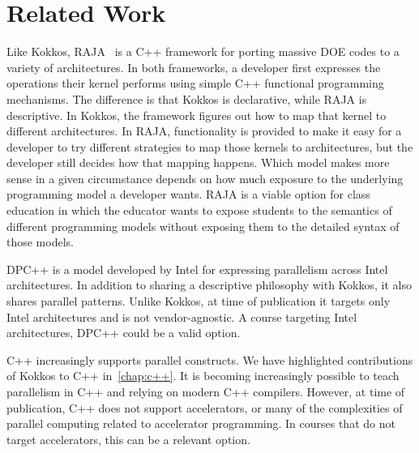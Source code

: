 \section{Related Work}\label{chap:related}
Like Kokkos, RAJA~\cite{RAJA} is a C++ framework for porting massive DOE codes to a variety of architectures. In both frameworks, a developer first expresses the operations their kernel performs using simple C++ functional programming mechanisms. The difference is that Kokkos is declarative, while RAJA is descriptive. In Kokkos, the framework figures out how to map that kernel to different architectures. In RAJA, functionality is provided to make it easy for a developer to try different strategies to map those kernels to architectures, but the developer still decides how that mapping happens. Which model makes more sense in a given circumstance depends on how much exposure to the underlying programming model a developer wants. RAJA is a viable option for class education in which the educator wants to expose students to the semantics of different programming models without exposing them to the detailed syntax of those models.

DPC++\cite{DPCPP} is a model developed by Intel\textsuperscript{\textregistered} for expressing parallelism across Intel architectures. In addition to sharing a descriptive philosophy with Kokkos, it also shares parallel patterns. Unlike Kokkos, at time of publication it targets only Intel architectures and is not vendor-agnostic. A course targeting Intel architectures, DPC++ could be a valid option.

C++ increasingly supports parallel constructs. We have highlighted contributions of Kokkos to C++ in~\ref{chap:c++}. It is becoming increasingly possible to teach parallelism in C++ and relying on modern C++ compilers. However, at time of publication, C++ does not support accelerators, or many of the complexities of parallel computing related to accelerator programming. In courses that do not target accelerators, this can be a relevant option.
 
